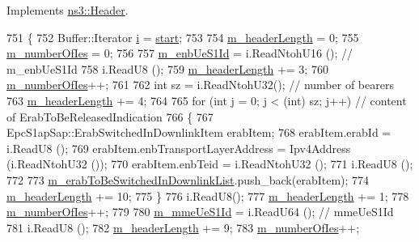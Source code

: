 Implements \hyperlink{classns3_1_1Header_a78be9400bb66b2a8543606f395ef5396}{ns3\+::\+Header}.


\begin{DoxyCode}
751 \{
752   Buffer::Iterator \hyperlink{bernuolliDistribution_8m_a6f6ccfcf58b31cb6412107d9d5281426}{i} = \hyperlink{namespacevisualizer_1_1core_a2a35e5d8a34af358b508dac8635754e0}{start};
753 
754   \hyperlink{classns3_1_1EpcS1APPathSwitchRequestHeader_a0865553a3dc85e1ba0b7956015a2ab75}{m\_headerLength} = 0;
755   \hyperlink{classns3_1_1EpcS1APPathSwitchRequestHeader_a7b8feb624d5290c0dbb7525283514d60}{m\_numberOfIes} = 0;
756 
757   \hyperlink{classns3_1_1EpcS1APPathSwitchRequestHeader_ac577234e0c15c7c1f689994d1faec01c}{m\_enbUeS1Id} = i.ReadNtohU16 ();     \textcolor{comment}{// m\_enbUeS1Id}
758   i.ReadU8 ();           
759   \hyperlink{classns3_1_1EpcS1APPathSwitchRequestHeader_a0865553a3dc85e1ba0b7956015a2ab75}{m\_headerLength} += 3;
760   \hyperlink{classns3_1_1EpcS1APPathSwitchRequestHeader_a7b8feb624d5290c0dbb7525283514d60}{m\_numberOfIes}++;
761 
762   \textcolor{keywordtype}{int} sz = i.ReadNtohU32(); \textcolor{comment}{// number of bearers}
763   \hyperlink{classns3_1_1EpcS1APPathSwitchRequestHeader_a0865553a3dc85e1ba0b7956015a2ab75}{m\_headerLength} += 4;
764 
765   \textcolor{keywordflow}{for} (\textcolor{keywordtype}{int} j = 0; j < (int) sz; j++) \textcolor{comment}{// content of ErabToBeReleasedIndication}
766   \{
767     EpcS1apSap::ErabSwitchedInDownlinkItem erabItem;
768     erabItem.erabId = i.ReadU8 ();
769     erabItem.enbTransportLayerAddress = Ipv4Address (i.ReadNtohU32 ());
770     erabItem.enbTeid = i.ReadNtohU32 ();
771     i.ReadU8 ();
772 
773     \hyperlink{classns3_1_1EpcS1APPathSwitchRequestHeader_af9e55298c3f2926e5bc3146b4e5b212f}{m\_erabToBeSwitchedInDownlinkList}.push\_back(erabItem);
774     \hyperlink{classns3_1_1EpcS1APPathSwitchRequestHeader_a0865553a3dc85e1ba0b7956015a2ab75}{m\_headerLength} += 10;
775   \}
776   i.ReadU8();
777   \hyperlink{classns3_1_1EpcS1APPathSwitchRequestHeader_a0865553a3dc85e1ba0b7956015a2ab75}{m\_headerLength} += 1;
778   \hyperlink{classns3_1_1EpcS1APPathSwitchRequestHeader_a7b8feb624d5290c0dbb7525283514d60}{m\_numberOfIes}++;
779 
780   \hyperlink{classns3_1_1EpcS1APPathSwitchRequestHeader_a1ba924af488ee3ae3afaf42632681048}{m\_mmeUeS1Id} = i.ReadU64 ();         \textcolor{comment}{// mmeUeS1Id}
781   i.ReadU8 ();                 
782   \hyperlink{classns3_1_1EpcS1APPathSwitchRequestHeader_a0865553a3dc85e1ba0b7956015a2ab75}{m\_headerLength} += 9;
783   \hyperlink{classns3_1_1EpcS1APPathSwitchRequestHeader_a7b8feb624d5290c0dbb7525283514d60}{m\_numberOfIes}++;

\end{DoxyCode}
